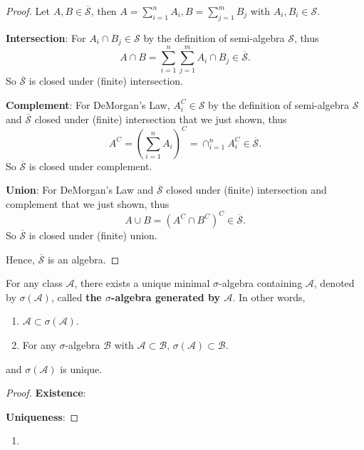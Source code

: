 \begin{proof}
	Let $A,B\in\overline{\mathcal{S}}$, then $A=\sum_{i=1}^{n}A_i, B=\sum_{j=1}^{m}B_j$ with $A_i,B_i\in\mathcal{S}$.\par
	\textbf{Intersection}: For $A_i\cap B_j\in\mathcal{S}$ by the definition of semi-algebra $\mathcal{S}$, thus $$A\cap B=\sum_{i=1}^{n}\sum_{j=1}^{m}A_i\cap B_j\in\overline{\mathcal{S}}.$$ So $\overline{\mathcal{S}}$ is closed under (finite) intersection.\par
	\textbf{Complement}: For DeMorgan's Law, $A_i^C\in\mathcal{S}$ by the definition of semi-algebra $\mathcal{S}$ and $\overline{\mathcal{S}}$ closed under (finite) intersection that we just shown, thus $$A^C=(\sum_{i=1}^{n}A_i)^C=\cap_{i=1}^{n}A_i^C\in\overline{\mathcal{S}}.$$ So $\overline{\mathcal{S}}$ is closed under complement.\par
	\textbf{Union}: For DeMorgan's Law and $\overline{\mathcal{S}}$ closed under (finite) intersection and complement that we just shown, thus $$A\cup B=(A^C\cap B^C)^C\in\overline{\mathcal{S}}.$$ So $\overline{\mathcal{S}}$ is closed under (finite) union.\par
	Hence, $\overline{\mathcal{S}}$ is an algebra.
\end{proof}

\begin{theorem}
	For any class $\mathcal{A}$, there exists a unique minimal $\sigma$-algebra containing $\mathcal{A}$, denoted by $\sigma(\mathcal{A})$, called \textbf{the $\sigma$-algebra generated by $\mathcal{A}$}. In other words,
	\begin{enumerate}
		\item $\mathcal{A}\subset\sigma(\mathcal{A})$.
		\item For any $\sigma$-algebra $\mathcal{B}$ with $\mathcal{A}\subset\mathcal{B}$, $\sigma(\mathcal{A})\subset\mathcal{B}$.
	\end{enumerate}
	and $\sigma(\mathcal{A})$ is unique.
\end{theorem}

\begin{proof}
	\textbf{Existence}:\par
	\textbf{Uniqueness}:\par
\end{proof}

\begin{example}
	\begin{enumerate}
		\item
	\end{enumerate}
\end{example}

